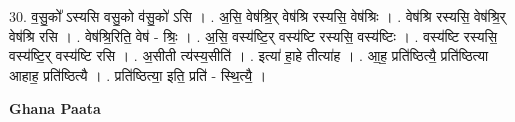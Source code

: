 \documentclass[17pt]{extarticle}
\begin{document}
30. व॒सु॒को᳚ ऽस्यसि वसु॒को व॑सु॒को॑ ऽसि । . अ॒सि॒ वेष॑श्रि॒र् वेष॑श्रि रस्यसि॒ वेष॑श्रिः । . वेष॑श्रि रस्यसि॒ वेष॑श्रि॒र् वेष॑श्रि रसि । . वेष॑श्रि॒रिति॒ वेष॑ - श्रिः॒ । . अ॒सि॒ वस्य॑ष्टि॒र् वस्य॑ष्टि रस्यसि॒ वस्य॑ष्टिः । . वस्य॑ष्टि रस्यसि॒ वस्य॑ष्टि॒र् वस्य॑ष्टि रसि । . अ॒सीती त्य॑स्य॒सीति॑ । . इत्या॑ हा॒हे तीत्या॑ह । . आ॒ह॒ प्रति॑ष्ठित्यै॒ प्रति॑ष्ठित्या आहाह॒ प्रति॑ष्ठित्यै । . प्रति॑ष्ठित्या॒ इति॒ प्रति॑ - स्थि॒त्यै॒ । \newline

\textbf{Ghana Paata } \newline
\end{document}
